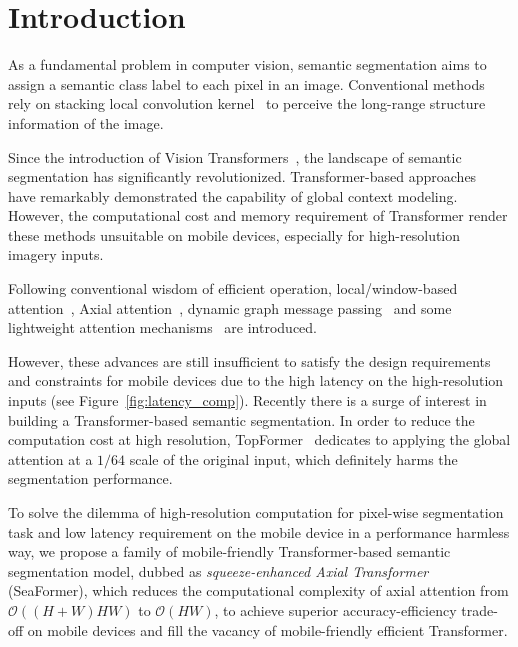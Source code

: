 \section{Introduction}
As a fundamental problem in computer vision, semantic segmentation aims to assign a semantic class label to each pixel in an image.
Conventional methods rely on stacking local convolution kernel~\cite{long2015fully} to perceive the long-range structure information of the image.

Since the introduction of Vision Transformers~\cite{dosovitskiy2020image}, the landscape of semantic segmentation has significantly revolutionized. 
Transformer-based approaches~\cite{zheng2021rethinking, xie2021segformer} have remarkably demonstrated the capability of global context modeling.
However, the computational cost and memory requirement of Transformer render these methods unsuitable on mobile devices, especially for high-resolution imagery inputs.

Following conventional wisdom of efficient operation, local/window-based attention~\cite{luong2015effective,liu2021swin,huang2021shuffle,yuan2021hrformer}, Axial attention~\cite{huang2019ccnet,ho2019axial,wang2020axial}, dynamic graph message passing~\cite{zhang2020dynamic,zhang2022dynamic} and some lightweight attention mechanisms~\cite{hou2020strip,li2021towards,li2021global,li2020improving,liu2018generating,shen2021efficient,xu2021co,cao2019gcnet,woo2018cbam,wang2020linformer,choromanski2020rethinking,chen2017rethinking,mehta2021mobilevit} are introduced. 


However, these advances are still insufficient to satisfy the design requirements and constraints for mobile devices due to the high latency on the high-resolution inputs (see Figure~\ref{fig:latency_comp}). 
Recently there is a surge of interest in building a Transformer-based semantic segmentation.
In order to reduce the computation cost at high resolution, 
TopFormer~\cite{zhang2022topformer} dedicates to applying the global attention at a $1/64$ scale of the original input, which definitely harms the segmentation performance.

To solve the dilemma of high-resolution computation for pixel-wise segmentation task and low latency requirement on the mobile device in a performance harmless way, we propose a family of mobile-friendly Transformer-based semantic segmentation model, dubbed as \textit{squeeze-enhanced Axial Transformer} (SeaFormer), which reduces the computational complexity of axial attention from $\mathcal{O}((H+W)HW)$ to $\mathcal{O}(HW)$, to achieve superior accuracy-efficiency trade-off on mobile devices and fill the vacancy of mobile-friendly efficient Transformer.

